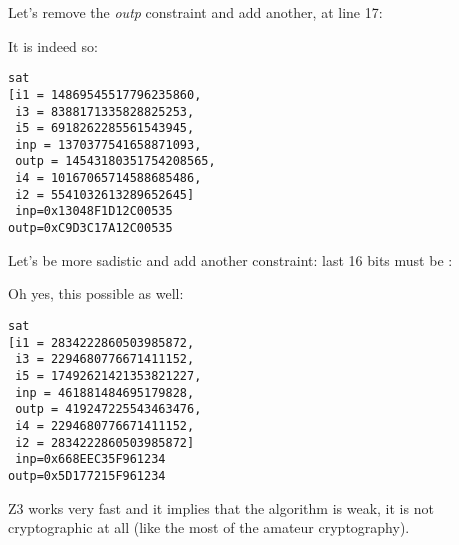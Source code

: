 Let's remove the \emph{outp} constraint and add another, at line 17:



It is indeed so:

\begin{lstlisting}
sat
[i1 = 14869545517796235860,
 i3 = 8388171335828825253,
 i5 = 6918262285561543945,
 inp = 1370377541658871093,
 outp = 14543180351754208565,
 i4 = 10167065714588685486,
 i2 = 5541032613289652645]
 inp=0x13048F1D12C00535
outp=0xC9D3C17A12C00535
\end{lstlisting}

Let's be more sadistic and add another constraint: last 16 bits must be :



Oh yes, this possible as well:

\begin{lstlisting}
sat
[i1 = 2834222860503985872,
 i3 = 2294680776671411152,
 i5 = 17492621421353821227,
 inp = 461881484695179828,
 outp = 419247225543463476,
 i4 = 2294680776671411152,
 i2 = 2834222860503985872]
 inp=0x668EEC35F961234
outp=0x5D177215F961234
\end{lstlisting}

Z3 works very fast and it implies that the algorithm is weak, it is not cryptographic at all
(like the most of the amateur cryptography).

